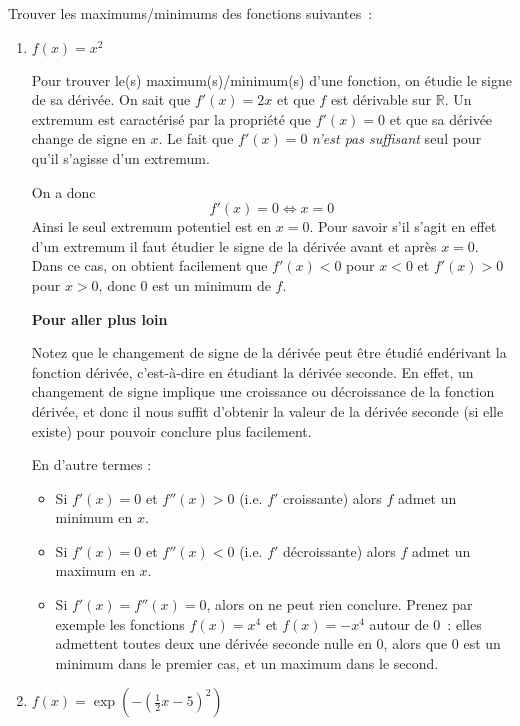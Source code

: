 \begin{exercice}[Extremum]
Trouver les maximums/minimums des fonctions suivantes~:
\begin{enumerate}
    \item $f(x) = x^2$
    
    Pour trouver le(s) maximum(s)/minimum(s) d'une fonction, on étudie le signe de sa dérivée. On sait que $f'(x) = 2x$ et que $f$ est dérivable sur $\mathbb{R}$. Un extremum est caractérisé par la propriété que $f'(x) = 0$ et que sa dérivée change de signe en $x$. Le fait que $f'(x) = 0$ \emph{n'est pas suffisant} seul pour qu'il s'agisse d'un extremum.
    
    On a donc
    \[
    f'(x) = 0 \iff x = 0
    \]
    Ainsi le seul extremum potentiel est en $x=0$. Pour savoir s'il s'agit en effet d'un extremum il faut étudier le signe de la dérivée avant et après $x = 0$. Dans ce cas, on obtient facilement que $f'(x) < 0$ pour $x < 0$ et $f'(x) > 0$ pour $x > 0$, donc $0$ est un minimum de $f$.
    
    \medskip
    \textbf{Pour aller plus loin\textellipsis}
    
    Notez que le changement de signe de la dérivée peut être étudié en\textellipsis dérivant la fonction dérivée, c'est-à-dire en étudiant la dérivée seconde. En effet, un changement de signe implique une croissance ou décroissance de la fonction dérivée, et donc il nous suffit d'obtenir la valeur de la dérivée seconde (si elle existe) pour pouvoir conclure plus facilement.
    
    En d'autre termes :
    \begin{itemize}
        \item Si $f'(x) = 0$ et $f''(x) > 0$ (i.e. $f'$ croissante) alors $f$ admet un minimum en $x$.
        \item Si $f'(x) = 0$ et $f''(x) < 0$ (i.e. $f'$ décroissante) alors $f$ admet un maximum en $x$.
        \item Si $f'(x) = f''(x) = 0$, alors on ne peut rien conclure. Prenez par exemple les fonctions $f(x) = x^4$ et $f(x) = -x^4$ autour de $0$~: elles admettent toutes deux une dérivée seconde nulle en $0$, alors que $0$ est un minimum dans le premier cas, et un maximum dans le second.
    \end{itemize}
    \medskip
    
    \item $f(x) = \exp \left(-\left( \frac{1}{2}x - 5 \right)^2 \right)$
    

\end{enumerate}
\end{exercice}
